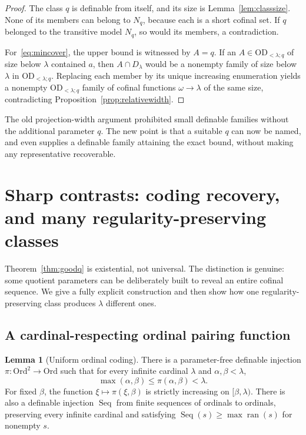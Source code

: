 \documentclass[11pt,letterpaper]{article}
\theoremstyle{definition}
\newtheorem{lemma}[definition]{Lemma}
\numberwithin{equation}{section}
\newcommand{\OD}{\mathrm{OD}}
\newcommand{\ran}{\operatorname{ran}}
\newcommand{\Ord}{\mathrm{Ord}}
\newcommand{\Dlam}{D_\lambda}
\newcommand{\ODq}{\OD_{<\lambda;q}}
\newcommand{\Seq}{\operatorname{Seq}}
\newcommand{\GPair}{\pi}
\begin{document}
\begin{proof}
The class $q$ is definable from itself, and its size is Lemma~\ref{lem:classsize}. None of its members can belong to $N_q$, because each is a short cofinal set. If $q$ belonged to the transitive model $N_q$, so would its members, a contradiction.

For~\eqref{eq:mincover}, the upper bound is witnessed by $A=q$. If an $A\in\ODq$ of size below $\lambda$ contained $a$, then $A\cap\Dlam$ would be a nonempty family of size below $\lambda$ in $\ODq$. Replacing each member by its unique increasing enumeration yields a nonempty $\ODq$ family of cofinal functions $\omega\to\lambda$ of the same size, contradicting Proposition~\ref{prop:relativewidth}.
\end{proof}

The old projection-width argument prohibited small definable families without the additional parameter $q$. The new point is that a suitable $q$ can now be named, and even supplies a definable family attaining the exact bound, without making any representative recoverable.

\section{Sharp contrasts: coding recovery, and many regularity-preserving classes}\label{sec:contrasts}

Theorem~\ref{thm:goodq} is existential, not universal. The distinction is genuine: some quotient parameters can be deliberately built to reveal an entire cofinal sequence. We give a fully explicit construction and then show how one regularity-preserving class produces $\lambda$ different ones.

\subsection{A cardinal-respecting ordinal pairing function}

\begin{lemma}[Uniform ordinal coding]\label{lem:pair}
There is a parameter-free definable injection $\GPair:\Ord^2\to\Ord$ such that for every infinite cardinal $\lambda$ and $\alpha,\beta<\lambda$,
\[
\max(\alpha,\beta)\le\GPair(\alpha,\beta)<\lambda.
\]
For fixed $\beta$, the function $\xi\mapsto\GPair(\xi,\beta)$ is strictly increasing on $[\beta,\lambda)$.
There is also a definable injection $\Seq$ from finite sequences of ordinals to ordinals, preserving every infinite cardinal and satisfying $\Seq(s)\ge\max\ran(s)$ for nonempty $s$.
\end{lemma}
\end{document}
